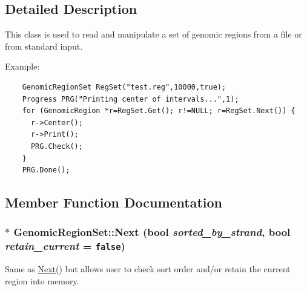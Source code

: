 \subsection{Detailed Description}
This class is used to read and manipulate a set of genomic regions from a file or from standard input. 

Example: 

\begin{Code}\begin{verbatim}    GenomicRegionSet RegSet("test.reg",10000,true);
    Progress PRG("Printing center of intervals...",1);
    for (GenomicRegion *r=RegSet.Get(); r!=NULL; r=RegSet.Next()) {
      r->Center();
      r->Print();
      PRG.Check();
    }
    PRG.Done();
\end{verbatim}
\end{Code}

 

\subsection{Member Function Documentation}
\hypertarget{classGenomicRegionSet_c11134b4ccc2ad002ef20ac12d3b70b8}{
\subsubsection[Next]{ $\ast$ GenomicRegionSet::Next (bool {\em sorted\_\-by\_\-strand}, \/  bool {\em retain\_\-current} = {\tt false})}}
\label{classGenomicRegionSet_c11134b4ccc2ad002ef20ac12d3b70b8}


Same as \hyperlink{classGenomicRegionSet_4f7501a27d13cae65247686182b78d51}{Next()} but allows user to check sort order and/or retain the current region into memory. 

